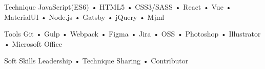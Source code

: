 

\begin{cvskills}

  \cvskill
    {Technique} %
    {JavaScript(ES6) • HTML5 • CSS3/SASS • React • Vue • MaterialUI • Node.js • Gatsby • jQuery • Mjml} %

  \cvskill
    {Tools} %
    {Git • Gulp • Webpack • Figma • Jira • OSS • Photoshop • Illustrator • Microsoft Office} %

  \cvskill
    {Soft Skills} %
    {Leadership • Technique Sharing • Contributor} %

\end{cvskills}
